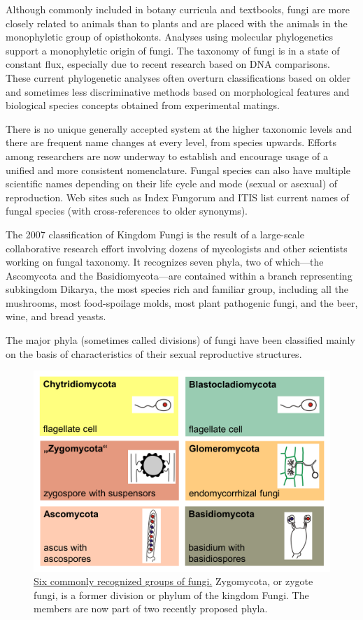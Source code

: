 Although commonly included in botany curricula and textbooks, fungi are more closely related to animals than to plants and are placed with the animals in the monophyletic group of opisthokonts. Analyses using molecular phylogenetics support a monophyletic origin of fungi. The taxonomy of fungi is in a state of constant flux, especially due to recent research based on DNA comparisons. These current phylogenetic analyses often overturn classifications based on older and sometimes less discriminative methods based on morphological features and biological species concepts obtained from experimental matings.

There is no unique generally accepted system at the higher taxonomic levels and there are frequent name changes at every level, from species upwards. Efforts among researchers are now underway to establish and encourage usage of a unified and more consistent nomenclature. Fungal species can also have multiple scientific names depending on their life cycle and mode (sexual or asexual) of reproduction. Web sites such as Index Fungorum and ITIS list current names of fungal species (with cross-references to older synonyms).

The 2007 classification of Kingdom Fungi is the result of a large-scale collaborative research effort involving dozens of mycologists and other scientists working on fungal taxonomy. It recognizes seven phyla, two of which---the Ascomycota and the Basidiomycota---are contained within a branch representing subkingdom Dikarya, the most species rich and familiar group, including all the mushrooms, most food-spoilage molds, most plant pathogenic fungi, and the beer, wine, and bread yeasts.

The major phyla (sometimes called divisions) of fungi have been classified mainly on the basis of characteristics of their sexual reproductive structures.



\begin{figure}

{\centering \includegraphics[width=0.7\linewidth]{./figures/fungi/02_01_groups_of_Fungi_(M._Piepenbring)} 

}

\caption{\href{https://commons.wikimedia.org/wiki/File:02_01_groups_of_Fungi_(M._Piepenbring).png}{Six commonly recognized groups of fungi.} Zygomycota, or zygote fungi, is a former division or phylum of the kingdom Fungi. The members are now part of two recently proposed phyla.}\label{fig:fungitaxonomy}
\end{figure}

